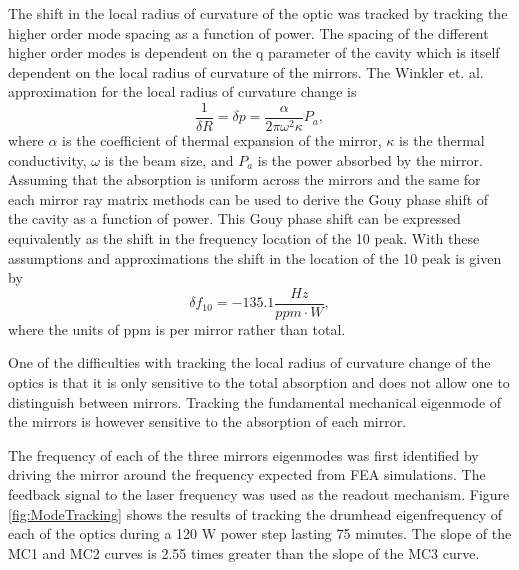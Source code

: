 \documentclass[10pt]{article}
\begin{document}
The shift in the local radius of curvature of the optic was tracked by 
tracking the higher order mode spacing as a function of power.  
The spacing of the different higher order modes is dependent on the q 
parameter of the cavity which is itself dependent on the local radius of 
curvature of the mirrors.  
The Winkler et. al.\cite{Winkler1991} approximation for the local radius of 
curvature change is
\begin{equation}
	\frac{1}{\delta R}=\delta p=\frac{\alpha}{2\pi\omega^2\kappa}P_a,
\end{equation}
where $\alpha$ is the coefficient of thermal expansion of the mirror,  
$\kappa$ is the thermal conductivity, $\omega$ is the beam size, and 
$P_a$ is the power absorbed by the mirror.  
Assuming that the absorption is uniform across the mirrors and the same for 
each mirror ray matrix methods can be used to derive the Gouy phase shift 
of the cavity as a function of power.  
This Gouy phase shift can be expressed equivalently as the shift in the 
frequency location of the 10 peak.  
With these assumptions and approximations the shift in the location of the 10 
peak is given by 
\begin{equation}
	\delta f_{10}=-135.1 \frac{Hz}{ppm\cdot W},
\end{equation}
where the units of ppm is per mirror rather than total.

One of the difficulties with tracking the local radius of curvature change of 
the optics is that it is only sensitive to the total absorption and does not 
allow one to distinguish between mirrors.  
Tracking the fundamental mechanical eigenmode of the mirrors is however sensitive 
to the absorption of each mirror.  

The frequency of each of the three mirrors eigenmodes was first identified by 
driving the mirror around the frequency expected from FEA simulations.  
The feedback signal to the laser frequency was used as the readout mechanism.  
Figure \ref{fig:ModeTracking} shows the results of tracking the drumhead eigenfrequency 
of each of the optics during a 120 W power step lasting 75 minutes.  
The slope of the MC1 and MC2 curves is 2.55 times greater than the slope of the 
MC3 curve.  
\end{document}
